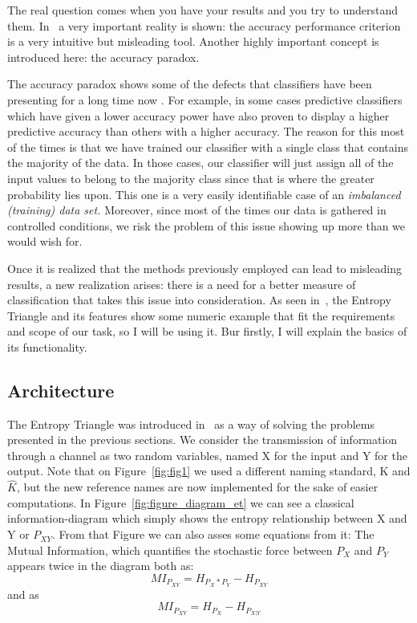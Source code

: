 The real question comes when you have your results and you try to understand them. In~\cite{val:pel:14a} a very important reality is shown: the accuracy performance criterion is a very intuitive but misleading tool. Another highly important concept is introduced here: the accuracy paradox. 

The accuracy paradox shows some of the defects that classifiers have been presenting for a long time now . For example, in some cases predictive classifiers which have given a lower accuracy power have also proven to display a higher predictive accuracy than others with a higher accuracy. The reason for this most of the times is that we have trained our classifier with a single class that contains the majority of the data. In those cases, our classifier will just assign all of the input values to belong to the majority class since that is where the greater probability lies upon. This one is a very easily identifiable case of an \emph{imbalanced (training) data set.} Moreover, since most of the times our data is gathered in controlled conditions, we risk the problem of this issue showing up more than we would wish for.\par

Once it is realized that the methods previously employed can lead to misleading results, a new realization arises: there is a need for a better measure of classification that takes this issue into consideration. As seen in~\cite{val:pel:14a}, the Entropy Triangle and its features show some numeric example that fit the requirements and scope of our task, so I will be using it. Bur firstly, I will explain the basics of its functionality.\par

\subsection{Architecture}

The Entropy Triangle was introduced in~\cite{val:pel:10b} as a way of solving the problems presented in the previous sections. We consider the transmission of information through a channel as two random variables, named X for the input and Y for the output. Note that on Figure~\ref{fig:fig1} we used a different naming standard, K and $\hat{K}$, but the new reference names are now implemented for the sake of easier computations. In Figure~\ref{fig:figure_diagram_et} we can see a classical information-diagram which simply shows the entropy relationship between X and Y or $P_{XY}$. From that Figure we can also asses some equations from it: 
%
The Mutual Information, which quantifies the stochastic force between $P_X$ and $P_Y$ appears twice in the diagram both as:
\begin{equation}\label{eq:mutual_information_1}
MI_{P_{XY}} = H_{P_X * P_Y} - H_{P_{XY}}
\end{equation}
and as 
\begin{equation}\label{eq:mutual_information_2}
MI_{P_{XY}} = H_{P_X} - H_{P_{X|Y}}
\end{equation}

